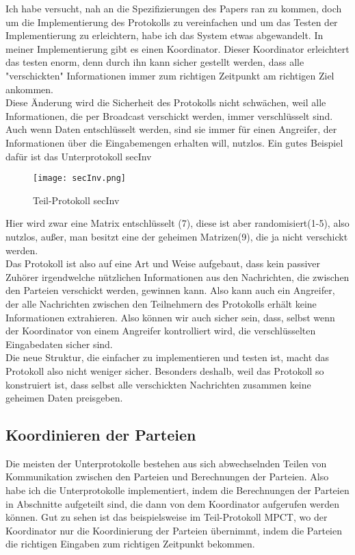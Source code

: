 Ich habe versucht, nah an die Spezifizierungen des Papers ran zu kommen, doch 
um die Implementierung des Protokolls zu vereinfachen und um das Testen der Implementierung zu erleichtern, habe ich das System etwas abgewandelt. In meiner Implementierung gibt es einen Koordinator. Dieser Koordinator erleichtert das testen enorm, denn durch ihn kann sicher gestellt werden, dass alle "verschickten" Informationen immer zum richtigen Zeitpunkt am richtigen Ziel ankommen.\\
Diese Änderung wird die Sicherheit des Protokolls nicht schwächen, weil alle Informationen, die per Broadcast verschickt werden, immer verschlüsselt sind.
Auch wenn Daten entschlüsselt werden, sind sie immer für einen Angreifer, der Informationen über die Eingabemengen erhalten will, nutzlos. Ein gutes Beispiel dafür ist das Unterprotokoll secInv \\

\begin{figure}[h]
\begin{center}
\texttt{[image: secInv.png]}
\caption{Teil-Protokoll secInv}
\cite{Doettling2021}
\label{oInv}
\end{center}

\end{figure}

Hier wird zwar eine Matrix entschlüsselt (7), diese ist aber randomisiert(1-5), also nutzlos, außer, man besitzt eine der geheimen Matrizen(9), die ja nicht verschickt werden.\\
Das Protokoll ist also auf eine Art und Weise aufgebaut, dass kein passiver Zuhörer irgendwelche nützlichen Informationen aus den Nachrichten, die zwischen den Parteien verschickt werden, gewinnen kann. Also kann auch ein Angreifer, der alle Nachrichten zwischen den Teilnehmern des Protokolls erhält keine Informationen extrahieren. Also können wir auch sicher sein, dass, selbst wenn der Koordinator von einem Angreifer kontrolliert wird, die verschlüsselten Eingabedaten sicher sind.\\
Die neue Struktur, die einfacher zu implementieren und testen ist, macht das Protokoll also nicht weniger sicher. Besonders deshalb, weil das Protokoll so konstruiert ist, dass selbst alle verschickten Nachrichten zusammen keine geheimen Daten preisgeben.\\

\subsection{Koordinieren der Parteien}
Die meisten der Unterprotokolle bestehen aus sich abwechselnden Teilen von Kommunikation zwischen den Parteien und Berechnungen der Parteien. Also habe ich die Unterprotokolle implementiert, indem die Berechnungen der Parteien in Abschnitte aufgeteilt sind, die dann von dem Koordinator aufgerufen werden können. Gut zu sehen ist das beispielsweise im Teil-Protokoll MPCT, wo der Koordinator nur die Koordinierung der Parteien übernimmt, indem die Parteien die richtigen Eingaben zum richtigen Zeitpunkt bekommen.\\

